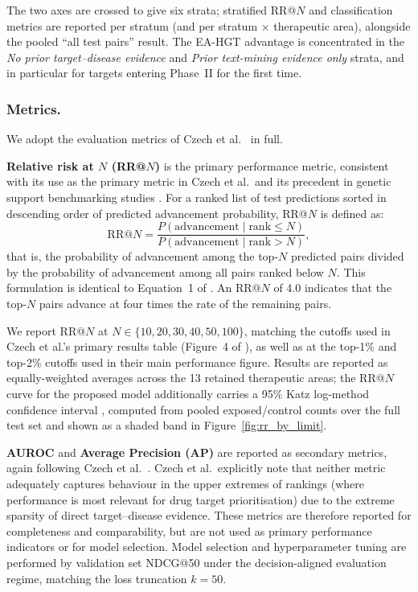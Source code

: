 \documentclass[a4,center]{NAR}
\newcommand{\eahgt}{\textsc{EA-HGT}}
\begin{document}
{The two axes are crossed to give six strata; stratified RR@$N$ and
classification metrics are reported per stratum (and per stratum
$\times$ therapeutic area), alongside the pooled ``all test pairs''
result. The \eahgt{} advantage is concentrated in the
\emph{No prior target--disease evidence} and \emph{Prior text-mining
evidence only} strata, and in particular for targets entering
Phase~II for the first time.

\subsubsection{Metrics.}
\label{sec:metrics}

We adopt the evaluation metrics of Czech et al.\ \citep{Czech2024CLINICALFORECASTING} in full.

\textbf{Relative risk at $N$ (RR@$N$)} is the primary performance metric,
consistent with its use as the primary metric in Czech et al.\ and its
precedent in genetic support benchmarking studies
\citep{Nelson2015, King2019, Minikel2024}. For a ranked list of test
predictions sorted in descending order of predicted advancement probability,
RR@$N$ is defined as:
\begin{equation}
    \text{RR@}N =
    \frac{P(\text{advancement} \mid \text{rank} \leq N)}
         {P(\text{advancement} \mid \text{rank} > N)},
    \label{eq:rrn}
\end{equation}
that is, the probability of advancement among the top-$N$ predicted pairs
divided by the probability of advancement among all pairs ranked below $N$.
This formulation is identical to Equation~1 of \citet{Czech2024CLINICALFORECASTING}. An
RR@$N$ of 4.0 indicates that the top-$N$ pairs advance at four times the
rate of the remaining pairs.

We report RR@$N$ at $N \in \{10, 20, 30, 40, 50, 100\}$, matching the
cutoffs used in Czech et al.'s primary results table (Figure~4 of
\citet{Czech2024CLINICALFORECASTING}), as well as at the top-1\% and top-2\% cutoffs used
in their main performance figure. Results are reported as
equally-weighted averages across the 13 retained therapeutic areas; the
RR@$N$ curve for the proposed model additionally carries a 95\% Katz
log-method confidence interval \citep{Katz1978ObtainingStudies}, computed
from pooled exposed/control counts over the full test set and shown as
a shaded band in Figure~\ref{fig:rr_by_limit}.

\textbf{AUROC} and \textbf{Average Precision (AP)} are reported as
secondary metrics, again following Czech et al.\ \citep{Czech2024CLINICALFORECASTING}. Czech
et al.\ explicitly note that neither metric adequately captures behaviour
in the upper extremes of rankings (where performance is most relevant
for drug target prioritisation) due to the extreme sparsity of
direct target--disease evidence. These metrics are therefore reported for
completeness and comparability, but are not used as primary performance
indicators or for model selection. Model selection and hyperparameter
tuning are performed by validation set NDCG@50 under the decision-aligned
evaluation regime, matching the loss truncation $k = 50$.

}
\end{document}
